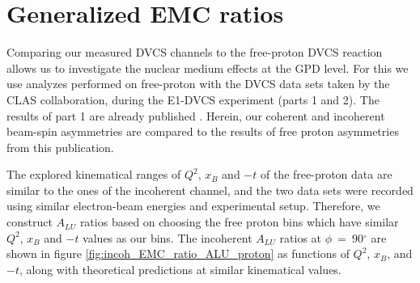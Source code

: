\section{Generalized EMC ratios} \label{sec:Generalized_EMC}
Comparing our measured DVCS channels to the free-proton DVCS reaction 
allows us to investigate the nuclear medium effects at the GPD level. For this 
we use analyzes performed on free-proton with the DVCS data sets taken by the CLAS 
collaboration, during the E1-DVCS experiment (parts 1 and 2). The results of 
part 1 are already published \cite{FX_BSA, CLAS_cross_section}. Herein, our 
coherent and incoherent beam-spin asymmetries are compared to the results of
free proton asymmetries from this publication.


The explored kinematical ranges of $Q^2$, $x_{B}$ and $-t$ of the free-proton 
data are similar to the ones of the incoherent channel, and the two data sets 
were recorded using similar electron-beam energies and experimental setup.  
Therefore, we construct $A_{LU}$ ratios based on choosing the free proton bins 
which have similar $Q^2$, $x_{B}$ and $-t$ values as our bins. The incoherent 
$A_{LU}$ ratios at $\phi$~=~90$^{\circ}$ are shown in figure 
\ref{fig:incoh_EMC_ratio_ALU_proton} as functions of $Q^{2}$, $x_{B}$, and 
$-t$, along with theoretical predictions at similar kinematical values.
  
